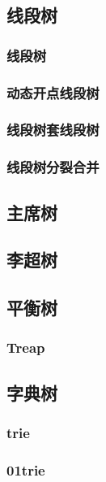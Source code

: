 ﻿\documentclass[a4paper,twocolumn]{article}
\begin{document}
\subsection{线段树}
\subsubsection{线段树}

\subsubsection{动态开点线段树}

\subsubsection{线段树套线段树}

\subsubsection{线段树分裂合并}

\subsection{主席树}

\subsection{李超树}

\subsection{平衡树}
\subsubsection{Treap}

\subsection{字典树}
\subsubsection{trie}

\subsubsection{01trie}

\end{document}
